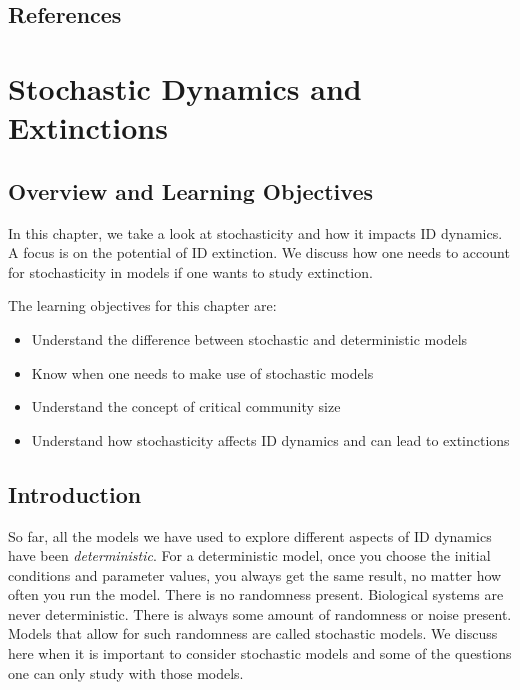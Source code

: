 \documentclass[
]{book}
\providecommand{\tightlist}{%
  \setlength{\itemsep}{0pt}\setlength{\parskip}{0pt}}
\begin{document}
\hypertarget{references-12}{%
\section{References}\label{references-12}}

\hypertarget{stochastic}{%
\chapter{Stochastic Dynamics and Extinctions}\label{stochastic}}

\hypertarget{overview-and-learning-objectives-12}{%
\section{Overview and Learning Objectives}\label{overview-and-learning-objectives-12}}

In this chapter, we take a look at stochasticity and how it impacts ID dynamics. A focus is on the potential of ID extinction. We discuss how one needs to account for stochasticity in models if one wants to study extinction.

The learning objectives for this chapter are:

\begin{itemize}
\tightlist
\item
  Understand the difference between stochastic and deterministic models
\item
  Know when one needs to make use of stochastic models
\item
  Understand the concept of critical community size
\item
  Understand how stochasticity affects ID dynamics and can lead to extinctions
\end{itemize}

\hypertarget{introduction-12}{%
\section{Introduction}\label{introduction-12}}

So far, all the models we have used to explore different aspects of ID dynamics have been \emph{deterministic}. For a deterministic model, once you choose the initial conditions and parameter values, you always get the same result, no matter how often you run the model. There is no randomness present. Biological systems are never deterministic. There is always some amount of randomness or noise present. Models that allow for such randomness are called stochastic models. We discuss here when it is important to consider stochastic models and some of the questions one can only study with those models.
\end{document}
